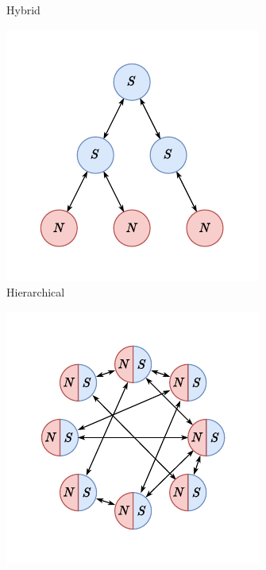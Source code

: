 \begin{figure}
\begin{subfigure}{.25\textwidth}
    \caption{Hybrid}
    \label{fig:bg.cids.hybrid}
  \end{subfigure}%
  \begin{subfigure}{.25\textwidth}
    \centering
    \includegraphics[width=\textwidth]{figures/topo-hierarchical}
    \caption{Hierarchical}
    \label{fig:bg.cids.hierarchical}
  \end{subfigure}%
  \begin{subfigure}{.25\textwidth}
    \centering
    \includegraphics[width=\textwidth]{figures/topo-distributed}

\end{subfigure}
\end{figure}
